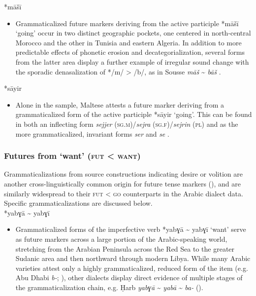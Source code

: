 \documentclass[output=paper]{langsci/langscibook}
\begin{document}
*māšī

\begin{itemize}

  \item[]
Grammaticalized future markers deriving from the active participle *māšī ‘going’ occur in two distinct geographic pockets, one centered in north-central Morocco and the other in Tunisia and eastern Algeria. In addition to more predictable effects of phonetic erosion and decategorialization, several forms from the latter area display a further example of irregular sound change with the sporadic denasalization of */m/ > /b/, as in Sousse \textit{māš} {\textasciitilde} \textit{bāš} \citep{Talmoudi1980}.
\end{itemize}
 
*sāyir

\begin{itemize}

 \item[]
Alone in the sample, Maltese attests a future marker deriving from a grammaticalized form of the active participle *sāyir ‘going’. This can be found in both an inflecting form \textit{sejjer} (\textsc{sg.m})/\textit{sejra} (\textsc{sg.f})/\textit{sejrin} (\textsc{pl}) and as the more grammaticalized, invariant forms \textit{ser} and \textit{se} \citep{Vanhove1993}.
\end{itemize}

\subsubsection{ Futures from ‘want’ (\textsc{fut} < \textsc{want})}

Grammaticalizations from source constructions indicating desire or volition are another cross-linguistically common origin for future tense markers (\citealt{Bybee1994,HeineKuteva2002}), and are similarly widespread to their \textsc{fut} < \textsc{go} counterparts in the Arabic dialect data. Specific grammaticalizations are discussed below.\\
 
*yabɣā {\textasciitilde} yabɣī 

\begin{itemize}

  \item[]
Grammaticalized forms of the imperfective verb *yabɣā {\textasciitilde} yabɣī ‘want’ serve as future markers across a large portion of the Arabic-speaking world, stretching from the Arabian Peninsula across the Red Sea to the greater Sudanic area and then northward through modern Libya. While many Arabic varieties attest only a highly grammaticalized, reduced form of the item (e.g. Abu Dhabi \textit{b-}; \citealt{Qafisheh1977}), other dialects display direct evidence of multiple stages of the grammaticalization chain, e.g. Ḥarb \textit{yabɣā} {\textasciitilde} \textit{yabā} {\textasciitilde} \textit{ba-} (\citealt{Il-Hazmy1975}).
\end{itemize}
 
\end{document}
